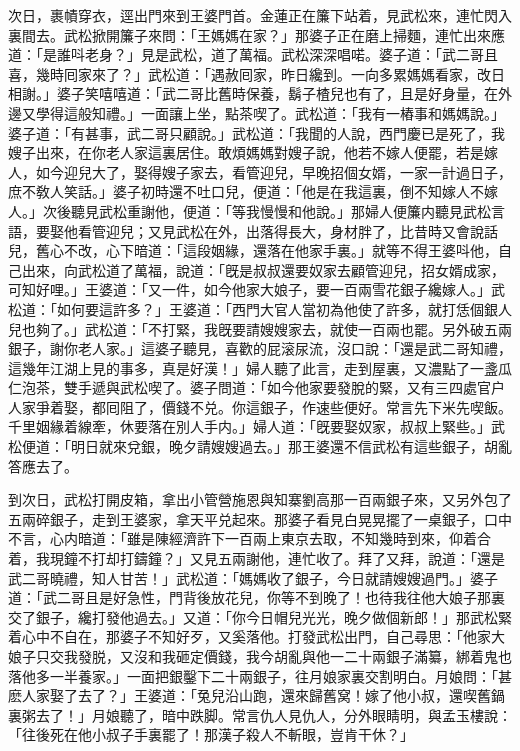 次日，裹幘穿衣，逕出門來到王婆門首。金蓮正在簾下站着，見武松來，連忙閃入裏間去。武松掀開簾子來問：「王媽媽在家？」那婆子正在磨上掃麵，連忙出來應道：「是誰呌老身？」見是武松，道了萬福。武松深深唱喏。婆子道：「武二哥且喜，幾時囘家來了？」武松道：「遇赦囘家，昨日纔到。一向多累媽媽看家，改日相謝。」婆子笑嘻嘻道：「武二哥比舊時保養，鬍子楂兒也有了，且是好身量，在外邊又學得這般知禮。」一面讓上坐，點茶喫了。武松道：「我有一樁事和媽媽說。」婆子道：「有甚事，武二哥只顧說。」武松道：「我聞的人說，西門慶已是死了，我嫂子出來，在你老人家這裏居住。敢煩媽媽對嫂子說，他若不嫁人便罷，若是嫁人，如今迎兒大了，娶得嫂子家去，看管迎兒，早晚招個女婿，一家一計過日子，庶不敎人笑話。」婆子初時還不吐口兒，便道：「他是在我這裏，倒不知嫁人不嫁人。」次後聽見武松重謝他，便道：「等我慢慢和他說。」那婦人便簾内聽見武松言語，要娶他看管迎兒；又見武松在外，出落得長大，身材胖了，比昔時又會說話兒，舊心不改，心下暗道：「這段姻緣，還落在他家手裏。」就等不得王婆呌他，自己出來，向武松道了萬福，說道：「旣是叔叔還要奴家去顧管迎兒，招女婿成家，可知好哩。」王婆道：「又一件，如今他家大娘子，要一百兩雪花銀子纔嫁人。」武松道：「如何要這許多？」王婆道：「西門大官人當初為他使了許多，就打恁個銀人兒也夠了。」武松道：「不打緊，我旣要請嫂嫂家去，就使一百兩也罷。另外破五兩銀子，謝你老人家。」這婆子聽見，喜歡的屁滚尿流，沒口說：「還是武二哥知禮，這幾年江湖上見的事多，真是好漢！」婦人聽了此言，走到屋裏，又濃點了一盞瓜仁泡茶，雙手遞與武松喫了。婆子問道：「如今他家要發脫的緊，又有三四處官户人家爭着娶，都囘阻了，價錢不兑。你這銀子，作速些便好。常言先下米先喫飯。千里姻緣着線牽，休要落在別人手内。」婦人道：「旣要娶奴家，叔叔上緊些。」武松便道：「明日就來兌銀，晚夕請嫂嫂過去。」那王婆還不信武松有這些銀子，胡亂答應去了。

到次日，武松打開皮箱，拿出小管營施恩與知寨劉高那一百兩銀子來，又另外包了五兩碎銀子，走到王婆家，拿天平兑起來。那婆子看見白晃晃擺了一桌銀子，口中不言，心内暗道：「雖是陳經濟許下一百兩上東京去取，不知幾時到來，仰着合着，我現鐘不打却打鑄鐘？」又見五兩謝他，連忙收了。拜了又拜，說道：「還是武二哥曉禮，知人甘苦！」武松道：「媽媽收了銀子，今日就請嫂嫂過門。」婆子道：「武二哥且是好急性，門背後放花兒，你等不到晚了！也待我往他大娘子那裏交了銀子，纔打發他過去。」又道：「你今日帽兒光光，晚夕做個新郎！」那武松緊着心中不自在，那婆子不知好歹，又奚落他。打發武松出門，自己尋思：「他家大娘子只交我發脱，又沒和我砸定價錢，我今胡亂與他一二十兩銀子滿纂，綁着鬼也落他多一半養家。」一面把銀鑿下二十兩銀子，往月娘家裏交割明白。月娘問：「甚麽人家娶了去了？」王婆道：「兔兒沿山跑，還來歸舊窝！嫁了他小叔，還喫舊鍋裏粥去了！」月娘聽了，暗中跌脚。常言仇人見仇人，分外眼睛明，與孟玉樓說：「往後死在他小叔子手裏罷了！那漢子殺人不斬眼，豈肯干休？」

